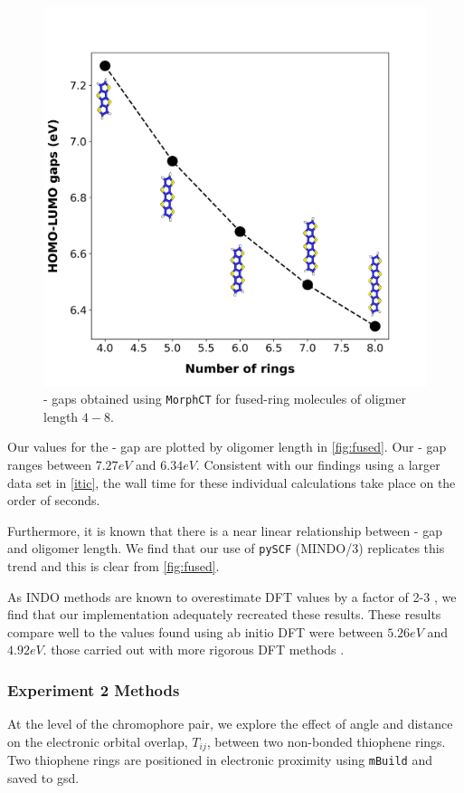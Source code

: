 \begin{figure}
  \center
  \includegraphics[width = .6\textwidth]{figures/fused-ring-figure.png}
  \caption{- gaps obtained using \texttt{MorphCT} for fused-ring molecules of oligmer length $4-8$.}
  \label{fig:fused}
\end{figure}

Our values for the - gap are plotted by oligomer length in \autoref{fig:fused}. 
Our - gap ranges between $7.27eV$ and $6.34eV$. Consistent with our findings using a larger data set
in \autoref{itic}, the wall time for these individual calculations take place on the order of seconds. 

Furthermore, it is known that there is a near linear
relationship between - gap and oligomer length. We find that our use of \texttt{pySCF} (MINDO/3) replicates
this trend and this is clear from \autoref{fig:fused}.

As INDO methods are known to overestimate DFT values by a factor of 2-3 \cite{Gorelsky2001}, we find that our
implementation adequately recreated these results.
These results compare well to the values found using ab initio DFT were between $5.26eV$ and $4.92eV$. 
 those carried out with more rigorous DFT methods \cite{Arago2010}.

\subsubsection{Experiment 2 Methods}

At the level of the chromophore pair, we explore the effect of angle and distance on the electronic orbital
overlap, $T_{ij}$, between two non-bonded thiophene rings.
Two thiophene rings are positioned in electronic proximity using \texttt{mBuild} and saved to gsd. 

